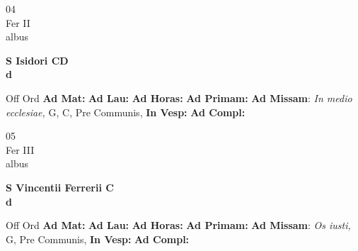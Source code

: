 \documentclass[10pt, openany]{book}
\begin{document}
    \begin{center}
        \begin{minipage}{3.5in}
            \vspace{2em}
            \begin{minipage}{0.5in}
                {\Huge 04} \\
                {\normalsize Fer II} \\
                {\normalsize albus}
            \end{minipage}
            \begin{minipage}{3.0in}
                \textbf{ \large S Isidori CD \\
                \textnormal{\normalsize d}} \\ 
            \end{minipage}
            \begin{justify}Off Ord
                \textbf{Ad Mat: }
                \textbf{Ad Lau: }
                \textbf{Ad Horas: }
                \textbf{Ad Primam: }\textbf{Ad Missam}: \textit{In medio ecclesiae,} G, C, Pre Communis,  
                \textbf{In Vesp: }
                \textbf{Ad Compl: }
            \end{justify}
        \end{minipage}
    \end{center}

    \begin{center}
        \begin{minipage}{3.5in}
            \vspace{2em}
            \begin{minipage}{0.5in}
                {\Huge 05} \\
                {\normalsize Fer III} \\
                {\normalsize albus}
            \end{minipage}
            \begin{minipage}{3.0in}
                \textbf{ \large S Vincentii Ferrerii C \\
                \textnormal{\normalsize d}} \\ 
            \end{minipage}
            \begin{justify}Off Ord
                \textbf{Ad Mat: }
                \textbf{Ad Lau: }
                \textbf{Ad Horas: }
                \textbf{Ad Primam: }\textbf{Ad Missam}: \textit{Os iusti,} G, Pre Communis,  
                \textbf{In Vesp: }
                \textbf{Ad Compl: }
            \end{justify}
        \end{minipage}
    \end{center}
\end{document}
